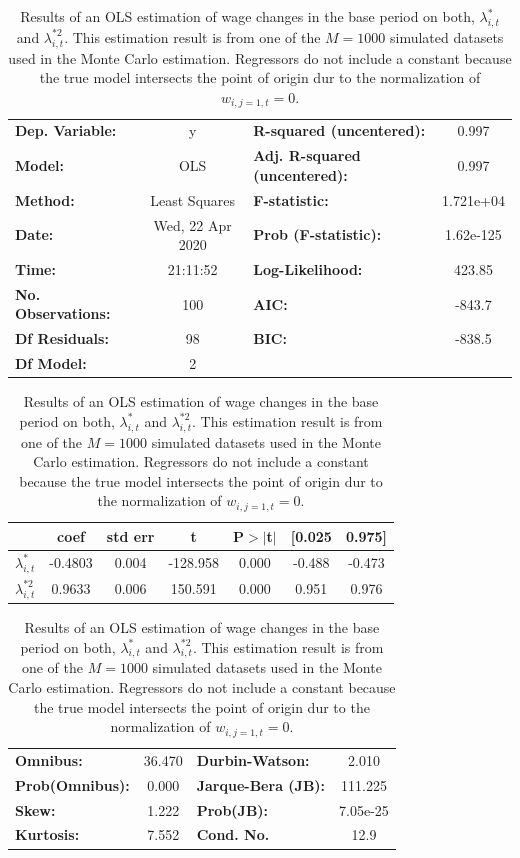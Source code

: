 \documentclass[../main.tex]{subfiles}
\begin{document}
\begin{table}
\begin{center}
\begin{tabular}{lclc}
\toprule
\textbf{Dep. Variable:}    &        y         & \textbf{  R-squared (uncentered):}      &     0.997   \\
\textbf{Model:}            &       OLS        & \textbf{  Adj. R-squared (uncentered):} &     0.997   \\
\textbf{Method:}           &  Least Squares   & \textbf{  F-statistic:       }          & 1.721e+04   \\
\textbf{Date:}             & Wed, 22 Apr 2020 & \textbf{  Prob (F-statistic):}          & 1.62e-125   \\
\textbf{Time:}             &     21:11:52     & \textbf{  Log-Likelihood:    }          &    423.85   \\
\textbf{No. Observations:} &         100      & \textbf{  AIC:               }          &    -843.7   \\
\textbf{Df Residuals:}     &          98      & \textbf{  BIC:               }          &    -838.5   \\
\textbf{Df Model:}         &           2      & \textbf{                     }          &             \\
\bottomrule
\end{tabular}
\begin{tabular}{lcccccc}
                  & \textbf{coef} & \textbf{std err} & \textbf{t} & \textbf{P$> |$t$|$} & \textbf{[0.025} & \textbf{0.975]}  \\
\midrule
\textbf{$\lambda_{i, t}^{*}$}   &      -0.4803  &        0.004     &  -128.958  &         0.000        &       -0.488    &       -0.473     \\
\textbf{$\lambda_{i, t}^{*2}$} &       0.9633  &        0.006     &   150.591  &         0.000        &        0.951    &        0.976     \\
\bottomrule
\end{tabular}
\begin{tabular}{lclc}
\textbf{Omnibus:}       & 36.470 & \textbf{  Durbin-Watson:     } &    2.010  \\
\textbf{Prob(Omnibus):} &  0.000 & \textbf{  Jarque-Bera (JB):  } &  111.225  \\
\textbf{Skew:}          &  1.222 & \textbf{  Prob(JB):          } & 7.05e-25  \\
\textbf{Kurtosis:}      &  7.552 & \textbf{  Cond. No.          } &     12.9  \\
\bottomrule
\end{tabular}
\end{center}
\caption{Results of an OLS estimation of wage changes in the base period on both, $\lambda_{i, t}^{*}$ and $\lambda_{i, t}^{*2}$. This estimation result is from one of the $M = 1000$ simulated datasets used in the Monte Carlo estimation. Regressors do not include a constant because the true model intersects the point of origin dur to the normalization of $w_{i,j=1,t} = 0$.}
\label{tab:base_period_regression_rlst}
\end{table}
\end{document}
